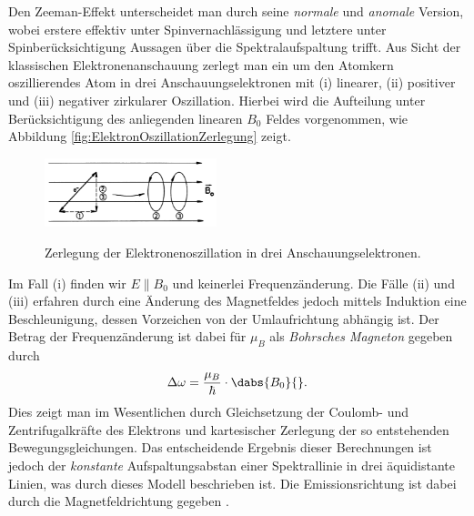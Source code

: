 Den Zeeman-Effekt unterscheidet man durch seine \emph{normale} und \emph{anomale} Version, wobei erstere effektiv unter Spinvernachlässigung und letztere unter Spinberücksichtigung Aussagen über die Spektralaufspaltung trifft. Aus Sicht der klassischen Elektronenanschauung zerlegt man ein um den Atomkern oszillierendes Atom in drei Anschauungselektronen mit (i) linearer, (ii) positiver und (iii) negativer zirkularer Oszillation. Hierbei wird die Aufteilung unter Berücksichtigung des anliegenden linearen $B_0$ Feldes vorgenommen, wie Abbildung \ref{fig:ElektronOszillationZerlegung} zeigt. 
\begin{figure}[H]
	\centering
	\includegraphics[width=5cm]{Bilddateien/Grundlagen/ElektronOszillationZerlegung.png}
	\label{fig:ElektronenOszillationZerlegung}
	\caption{Zerlegung der Elektronenoszillation in drei Anschauungselektronen.}
\end{figure}
Im Fall (i) finden wir $E\parallel B_0$ und keinerlei Frequenzänderung. Die Fälle (ii) und (iii) erfahren durch eine Änderung des Magnetfeldes jedoch mittels Induktion eine Beschleunigung, dessen Vorzeichen von der Umlaufrichtung abhängig ist. Der Betrag der Frequenzänderung ist dabei für $\mu_B$ als \emph{Bohrsches Magneton} gegeben durch 
\[
	\Delta\omega = \frac{\mu_B}{\hbar}\cdot\dabs{B_0}{}.
\]
Dies zeigt man im Wesentlichen durch Gleichsetzung der Coulomb- und Zentrifugalkräfte des Elektrons und kartesischer Zerlegung der so entstehenden Bewegungsgleichungen. Das entscheidende Ergebnis dieser Berechnungen ist jedoch der \emph{konstante} Aufspaltungsabstan einer Spektrallinie in drei äquidistante Linien, was durch dieses Modell beschrieben ist. Die Emissionsrichtung ist dabei durch die Magnetfeldrichtung gegeben \cite[p.216ff]{HakenWolf}.

